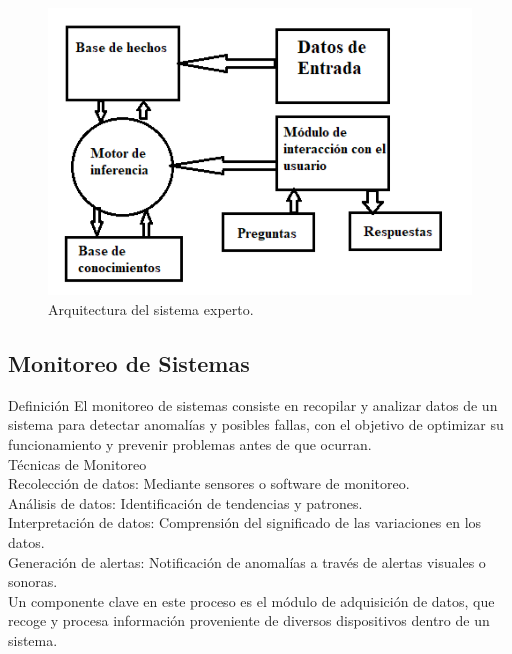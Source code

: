 \begin{figure}[H]
  \begin{center}
  \includegraphics[scale = 1.0]{./images/grafico}
  \caption{Arquitectura del sistema experto.}
  \label{fig:grafico}
  \end{center}
  \end{figure}
  \subsection{Monitoreo de Sistemas}
  Definición
  El monitoreo de sistemas consiste en recopilar y analizar datos de un sistema para detectar anomalías y posibles fallas, con el objetivo de optimizar su funcionamiento y prevenir problemas antes de que ocurran.\\
  Técnicas de Monitoreo\\
  Recolección de datos: Mediante sensores o software de monitoreo.\\
  Análisis de datos: Identificación de tendencias y patrones.\\
  Interpretación de datos: Comprensión del significado de las variaciones en los datos.\\
  Generación de alertas: Notificación de anomalías a través de alertas visuales o sonoras.\\
  Un componente clave en este proceso es el módulo de adquisición de datos, que recoge y procesa información proveniente de diversos dispositivos dentro de un sistema.\\
